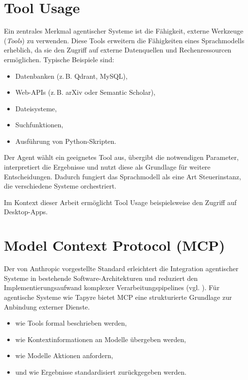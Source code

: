 \section{Tool Usage}

Ein zentrales Merkmal agentischer Systeme ist die Fähigkeit, externe Werkzeuge (\textit{Tools}) zu verwenden. Diese Tools erweitern die Fähigkeiten eines Sprachmodells erheblich, da sie den Zugriff auf externe Datenquellen und Rechenressourcen ermöglichen. Typische Beispiele sind:

\begin{itemize}
    \item Datenbanken (z.\,B. Qdrant, MySQL),
    \item Web-APIs (z.\,B. arXiv oder Semantic Scholar),
    \item Dateisysteme,
    \item Suchfunktionen,
    \item Ausführung von Python-Skripten.
\end{itemize}

Der Agent wählt ein geeignetes Tool aus, übergibt die notwendigen Parameter, interpretiert die Ergebnisse und nutzt diese als Grundlage für weitere Entscheidungen. Dadurch fungiert das Sprachmodell als eine Art Steuerinstanz, die verschiedene Systeme orchestriert.

Im Kontext dieser Arbeit ermöglicht Tool Usage beispielsweise den Zugriff auf Desktop-Apps.

\section{Model Context Protocol (MCP)}

Der von Anthropic vorgestellte Standard erleichtert die Integration agentischer Systeme in bestehende Software-Architekturen und reduziert den Implementierungsaufwand komplexer Verarbeitungspipelines (vgl. \cite{anthropic2024mcp}). Für agentische Systeme wie Tapyre bietet MCP eine strukturierte Grundlage zur Anbindung externer Dienste.

\begin{itemize}
    \item wie Tools formal beschrieben werden,
    \item wie Kontextinformationen an Modelle übergeben werden,
    \item wie Modelle Aktionen anfordern,
    \item und wie Ergebnisse standardisiert zurückgegeben werden.
\end{itemize}

